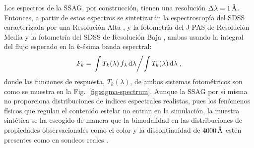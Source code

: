 Los espectros de la SSAG, por construcción, tienen una resolución $\Delta\lambda=\unit[1]{\AA}$.
Entonces, a partir de estos espectros se sintetizarán la espectroscopía del SDSS caracterizada por
una Resolución Alta \citep[RA: $\Delta\lambda=1\,\text{\AA}$][]{Strauss2002}, y la fotometría del
J-PAS de Resolución Media \citep[RM: $\Delta\lambda=140\,\text{\AA}$][]{Marin-Franch2015} y la
fotometría del SDSS de Resolución Baja \citep[RB: $\Delta\lambda\sim1000\,{\AA}$][]{Doi2010}, ambas
usando la integral del flujo esperado en la $k$-ésima banda espectral:
%
\begin{equation}\label{ec:flujo-esperado}
F_k = \left.\int T_k(\lambda)\,f_\lambda\,\text{d}\lambda\middle/\int T_k(\lambda)\,\text{d}\lambda\right.,
\end{equation}
%
donde las funciones de respuesta, $T_k(\lambda)$, de ambos sistemas fotométricos son como se muestra
en la Fig.~\ref{fig:sigma-spectrum}. Aunque la SSAG por sí misma no proporciona distribuciones de
índices espectrales realistas, pues los fenómenos físicos que regulan el contenido estelar no entran
en la simulación, la muestra sintética se ha escogido de manera que la bimodalidad en las
distribuciones de propiedades observacionales como el color y la discontinuidad de
$\unit[4000]{\AA}$ estén presentes como en sondeos reales \citep{Strateva2001, Kauffmann2003,
Baldry2004}.


